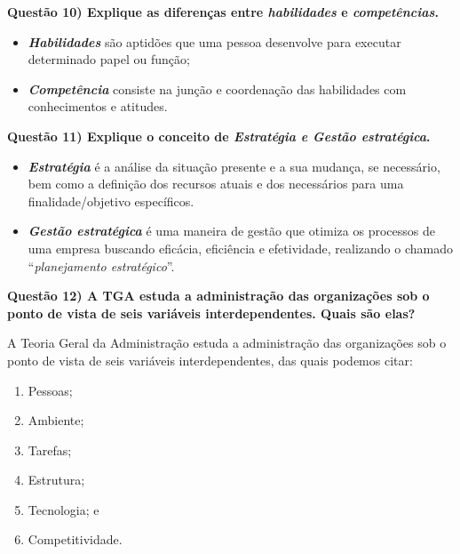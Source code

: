 \documentclass{article}
\begin{document}
\noindent \textbf{Questão 10) Explique as diferenças entre \emph{habilidades} e \emph{competências}.}
\begin{itemize}
    \item \textbf{\emph{Habilidades}} são aptidões que uma pessoa desenvolve para executar determinado papel ou função;
    \item \textbf{\emph{Competência}} consiste na junção e coordenação das habilidades com conhecimentos e atitudes.
\end{itemize}

\noindent \textbf{Questão 11) Explique o conceito de \emph{Estratégia e Gestão estratégica}.}
\begin{itemize}
    \item \textbf{\emph{Estratégia}} é a análise da situação presente e a sua mudança, se necessário, bem como a definição dos recursos atuais e dos necessários para uma finalidade/objetivo específicos.
    \item \textbf{\emph{Gestão estratégica}} é uma maneira de gestão que otimiza os processos de uma empresa buscando eficácia, eficiência e efetividade, realizando o chamado “\emph{planejamento estratégico}”.
\end{itemize}

\noindent \textbf{Questão 12) A TGA estuda a administração das organizações sob o ponto de vista de seis variáveis interdependentes. Quais são elas?}
\par A Teoria Geral da Administração estuda a administração das organizações sob o ponto de vista de seis variáveis interdependentes, das quais podemos citar:
\begin{enumerate}
    \item Pessoas;
    \item Ambiente;
    \item Tarefas;
    \item Estrutura;
    \item Tecnologia; e
    \item Competitividade.
\end{enumerate}
\end{document}
